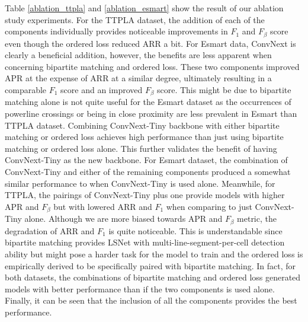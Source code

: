 \documentclass[journal]{IEEEtran}
\begin{document}
Table \ref{ablation_ttpla} and \ref{ablation_esmart} show the result of our ablation study experiments. For the TTPLA dataset, the addition of each of the components individually provides noticeable improvements in $F_1$ and $F_{\beta}$ score even though the ordered loss reduced ARR a bit. For Esmart data, ConvNext is clearly a beneficial addition, however, the benefits are less apparent when concerning bipartite matching and ordered loss. These two components improved APR at the expense of ARR at a similar degree, ultimately resulting in a comparable $F_1$ score and an improved $F_{\beta}$ score. This might be due to bipartite matching alone is not quite useful for the Esmart dataset as the occurrences of powerline crossings or being in close proximity are less prevalent in Esmart than TTPLA dataset. Combining ConvNext-Tiny backbone with either bipartite matching or ordered loss achieves high performance than just using bipartite matching or ordered loss alone. This further validates the benefit of having ConvNext-Tiny as the new backbone. For Esmart dataset, the combination of ConvNext-Tiny and either of the remaining components produced a somewhat similar performance to when ConvNext-Tiny is used alone. Meanwhile, for TTPLA, the pairings of ConvNext-Tiny plus one provide models with higher APR and $F_{\beta}$ but with lowered ARR and $F_1$ when comparing to just ConvNext-Tiny alone. Although we are more biased towards APR and $F_{\beta}$ metric, the degradation of ARR and $F_1$ is quite noticeable. This is understandable since bipartite matching provides LSNet with multi-line-segment-per-cell detection ability but might pose a harder task for the model to train and the ordered loss is empirically derived to be specifically paired with bipartite matching. In fact, for both datasets, the combinations of bipartite matching and ordered loss generated models with better performance than if the two components is used alone. Finally, it can be seen that the inclusion of all the components provides the best performance.
\end{document}
